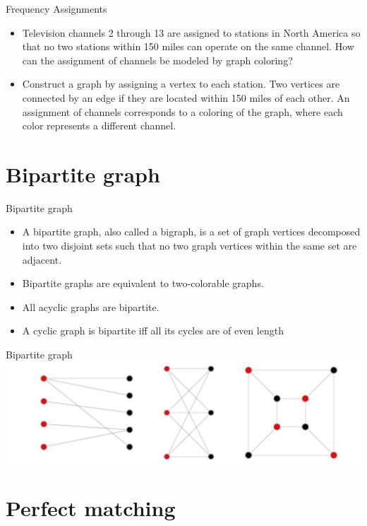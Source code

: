 \documentclass{beamer}
\theoremstyle{definition}
\begin{document}
\begin{frame}{Frequency Assignments}
    \begin{itemize}
        \item Television channels 2 through 13 are assigned to stations in North America so that no two stations within 150 miles can operate on the same channel. How can the assignment of channels be modeled by graph coloring?
        \item Construct a graph by assigning a vertex to each station. Two vertices are connected by an edge if they are located within 150 miles of each other. An assignment of channels corresponds to a coloring of the graph, where each color represents a different channel.
    \end{itemize}
\end{frame}

\section{Bipartite graph}

\begin{frame}{Bipartite graph}
    \begin{itemize}
        \item A bipartite graph, also called a bigraph, is a set of graph vertices decomposed into two disjoint sets such that no two graph vertices within the same set are adjacent.
        \item Bipartite graphs are equivalent to two-colorable graphs. 
        \item All acyclic graphs are bipartite. 
        \item A cyclic graph is bipartite iff all its cycles are of even length
    \end{itemize}
\end{frame}

\begin{frame}{Bipartite graph}
    \centering \includegraphics[width=.7\linewidth]{p5.PNG}
\end{frame}

\section{Perfect matching}
\end{document}
